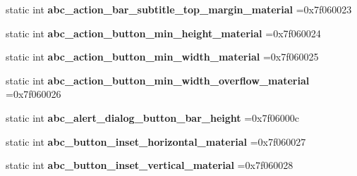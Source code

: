 \begin{DoxyCompactItemize}
static int {\bfseries abc\+\_\+action\+\_\+bar\+\_\+subtitle\+\_\+top\+\_\+margin\+\_\+material} =0x7f060023
\item 
\mbox{\label{classandroid_1_1support_1_1graphics_1_1drawable_1_1animated_1_1R_1_1dimen_ab800042f613e32d423e8da1b9abf2bda}} 
static int {\bfseries abc\+\_\+action\+\_\+button\+\_\+min\+\_\+height\+\_\+material} =0x7f060024
\item 
\mbox{\label{classandroid_1_1support_1_1graphics_1_1drawable_1_1animated_1_1R_1_1dimen_abfb971a441d4358c36b50a93cb286196}} 
static int {\bfseries abc\+\_\+action\+\_\+button\+\_\+min\+\_\+width\+\_\+material} =0x7f060025
\item 
\mbox{\label{classandroid_1_1support_1_1graphics_1_1drawable_1_1animated_1_1R_1_1dimen_a0cd7eb7c9d55e1096d9d4f8a9f7e380e}} 
static int {\bfseries abc\+\_\+action\+\_\+button\+\_\+min\+\_\+width\+\_\+overflow\+\_\+material} =0x7f060026
\item 
\mbox{\label{classandroid_1_1support_1_1graphics_1_1drawable_1_1animated_1_1R_1_1dimen_a64e0e8e69e9bc5fbb4543d7456e5309a}} 
static int {\bfseries abc\+\_\+alert\+\_\+dialog\+\_\+button\+\_\+bar\+\_\+height} =0x7f06000c
\item 
\mbox{\label{classandroid_1_1support_1_1graphics_1_1drawable_1_1animated_1_1R_1_1dimen_ad1c48eebb80411dd83dd6b884b54302a}} 
static int {\bfseries abc\+\_\+button\+\_\+inset\+\_\+horizontal\+\_\+material} =0x7f060027
\item 
\mbox{\label{classandroid_1_1support_1_1graphics_1_1drawable_1_1animated_1_1R_1_1dimen_a1c7cc6b22a01a34f73c2cd7e03a87c19}} 
static int {\bfseries abc\+\_\+button\+\_\+inset\+\_\+vertical\+\_\+material} =0x7f060028
\item 
\mbox{\label{classandroid_1_1support_1_1graphics_1_1drawable_1_1animated_1_1R_1_1dimen_abe16473ecf2553b75eb84ffd0d3359a5}} 

\end{DoxyCompactItemize}
